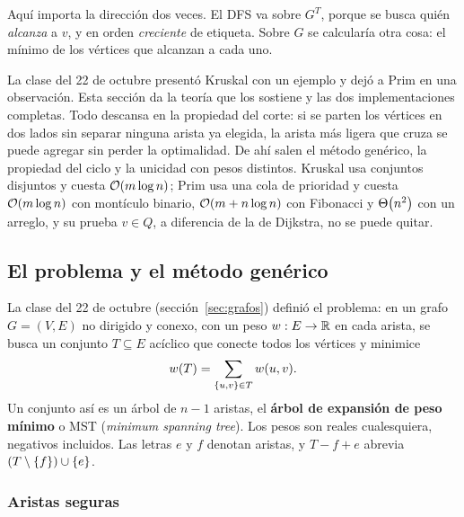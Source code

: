 \documentclass[11pt,letterpaper]{article}
\begin{document}
\begin{ojo}
  Aquí importa la dirección dos veces. El DFS va sobre $G^T$, porque se
  busca quién \emph{alcanza} a $v$, y en orden \emph{creciente} de
  etiqueta. Sobre $G$ se calcularía otra cosa: el mínimo de los
  vértices que alcanzan a cada uno.
\end{ojo}

\newpage


\label{sec:mst}

\begin{quick_sum}
  La clase del 22 de octubre presentó Kruskal con un ejemplo y dejó a
  Prim en una observación. Esta sección da la teoría que los sostiene
  y las dos implementaciones completas. Todo descansa en la propiedad
  del corte: si se parten los vértices en dos lados sin separar
  ninguna arista ya elegida, la arista más ligera que cruza se puede
  agregar sin perder la optimalidad. De ahí salen el método genérico,
  la propiedad del ciclo y la unicidad con pesos distintos. Kruskal
  usa conjuntos disjuntos y cuesta $\mathcal{O}\!\left(m \log n\right)$; Prim usa una cola
  de prioridad y cuesta $\mathcal{O}\!\left(m \log n\right)$ con montículo binario,
  $\mathcal{O}\!\left(m + n \log n\right)$ con Fibonacci y $\Theta\!\left(n^2\right)$ con un arreglo, y
  su prueba $v \in Q$, a diferencia de la de Dijkstra, no se puede
  quitar.
\end{quick_sum}

\subsection*{El problema y el método genérico}

La clase del 22 de octubre (sección~\ref{sec:grafos}) definió el
problema: en un grafo $G = (V, E)$ no dirigido y conexo, con un peso
$w : E \to \mathbb{R}$ en cada arista, se busca un conjunto $T \subseteq E$
acíclico que conecte todos los vértices y minimice
\[
  w(T) = \sum_{\left\{ u, v \right\} \in T} w(u, v) .
\]
Un conjunto así es un árbol de $n - 1$ aristas, el \textbf{árbol de
expansión de peso mínimo} o MST (\textit{minimum spanning tree}). Los
pesos son reales cualesquiera, negativos incluidos. Las letras $e$ y
$f$ denotan aristas, y $T - f + e$ abrevia
$(T \setminus \left\{ f \right\}) \cup \left\{ e \right\}$.

\subsubsection*{Aristas seguras}
\end{document}
